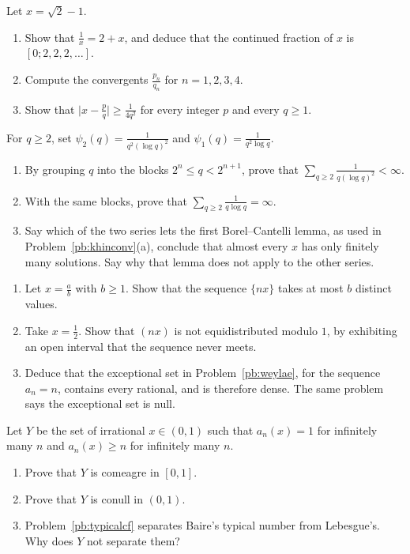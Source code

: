 \begin{exercise}[$\star$]\label{ex:v7c13a}
Let $x=\sqrt2-1$.
\begin{enumerate}[label=(\alph*)]
\item Show that $\frac1x=2+x$, and deduce that the continued fraction of $x$ is $[0;2,2,2,\dots]$.
\item Compute the convergents $\frac{p_n}{q_n}$ for $n=1,2,3,4$.
\item Show that $\bigl|x-\frac pq\bigr|\ge\frac1{4q^2}$ for every integer $p$ and every $q\ge1$.
\end{enumerate}
\end{exercise}

\begin{exercise}[$\star\star$]\label{ex:v7c13b}
For $q\ge2$, set $\psi_2(q)=\frac1{q^2(\log q)^2}$ and $\psi_1(q)=\frac1{q^2\log q}$.
\begin{enumerate}[label=(\alph*)]
\item By grouping $q$ into the blocks $2^n\le q<2^{n+1}$, prove that $\sum_{q\ge2}\frac1{q(\log q)^2}<\infty$.
\item With the same blocks, prove that $\sum_{q\ge2}\frac1{q\log q}=\infty$.
\item Say which of the two series lets the first Borel--Cantelli lemma, as used in Problem~\ref{pb:khinconv}(a), conclude that almost every $x$ has only finitely many solutions. Say why that lemma does not apply to the other series.
\end{enumerate}
\end{exercise}

\begin{exercise}[$\star\star$]\label{ex:v7c13c}
\begin{enumerate}[label=(\alph*)]
\item Let $x=\frac ab$ with $b\ge1$. Show that the sequence $\{nx\}$ takes at most $b$ distinct values.
\item Take $x=\frac12$. Show that $(nx)$ is not equidistributed modulo $1$, by exhibiting an open interval that the sequence never meets.
\item Deduce that the exceptional set in Problem~\ref{pb:weylae}, for the sequence $a_n=n$, contains every rational, and is therefore dense. The same problem says the exceptional set is null.
\end{enumerate}
\end{exercise}

\begin{exercise}[$\star\star\star$]\label{ex:v7c13d}
Let $Y$ be the set of irrational $x\in(0,1)$ such that $a_n(x)=1$ for infinitely many $n$ and $a_n(x)\ge n$ for infinitely many $n$.
\begin{enumerate}[label=(\alph*)]
\item Prove that $Y$ is comeagre in $[0,1]$.
\item Prove that $Y$ is conull in $(0,1)$.
\item Problem~\ref{pb:typicalcf} separates Baire's typical number from Lebesgue's. Why does $Y$ not separate them?
\end{enumerate}
\end{exercise}

